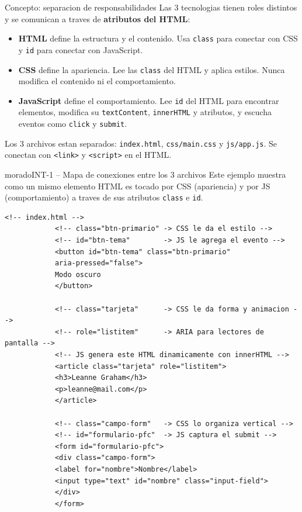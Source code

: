 \documentclass[11pt,a4paper]{article}
\begin{document}
	\begin{cajaconcepto}{Concepto: separacion de responsabilidades}
		Las 3 tecnologias tienen roles distintos y se comunican a traves de \textbf{atributos del HTML}:
		
		\begin{itemize}[leftmargin=1.2em,itemsep=3pt]
			\item \textbf{HTML} define la estructura y el contenido. Usa \texttt{class} para conectar con CSS y \texttt{id} para conectar con JavaScript.
			\item \textbf{CSS} define la apariencia. Lee las \texttt{class} del HTML y aplica estilos. Nunca modifica el contenido ni el comportamiento.
			\item \textbf{JavaScript} define el comportamiento. Lee \texttt{id} del HTML para encontrar elementos, modifica su \texttt{textContent}, \texttt{innerHTML} y atributos, y escucha eventos como \texttt{click} y \texttt{submit}.
		\end{itemize}
		
		Los 3 archivos estan separados: \texttt{index.html}, \texttt{css/main.css} y \texttt{js/app.js}. Se conectan con \texttt{<link>} y \texttt{<script>} en el HTML.
	\end{cajaconcepto}
	
	\begin{cajacodigo}{morado}{INT-1 -- Mapa de conexiones entre los 3 archivos}
		{\color{codigotexto}\small Este ejemplo muestra como un mismo elemento HTML es tocado por CSS (apariencia) y por JS (comportamiento) a traves de sus atributos \texttt{class} e \texttt{id}.}
		\begin{lstlisting}[style=codehtml]
			<!-- index.html -->
			<!-- class="btn-primario" -> CSS le da el estilo -->
			<!-- id="btn-tema"        -> JS le agrega el evento -->
			<button id="btn-tema" class="btn-primario"
			aria-pressed="false">
			Modo oscuro
			</button>
			
			<!-- class="tarjeta"      -> CSS le da forma y animacion -->
			<!-- role="listitem"      -> ARIA para lectores de pantalla -->
			<!-- JS genera este HTML dinamicamente con innerHTML -->
			<article class="tarjeta" role="listitem">
			<h3>Leanne Graham</h3>
			<p>leanne@mail.com</p>
			</article>
			
			<!-- class="campo-form"   -> CSS lo organiza vertical -->
			<!-- id="formulario-pfc"  -> JS captura el submit -->
			<form id="formulario-pfc">
			<div class="campo-form">
			<label for="nombre">Nombre</label>
			<input type="text" id="nombre" class="input-field">
			</div>
			</form>
		\end{lstlisting}
	\end{cajacodigo}
	
\end{document}
